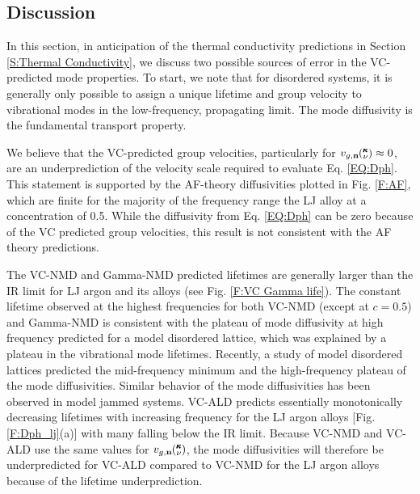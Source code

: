 \documentclass[aps,prb,onecolumn,preprint,footinbib,superscriptaddress,amsmath,amssymb,floatfix]{revtex4}
\newcommand{\kv}{\mspace{-4.0mu}\left(\mspace{-8.0mu}
\begin{smallmatrix}&\pmb{\kappa} \\&\nu\end{smallmatrix}
\mspace{-3.0mu}\right)}
\begin{document}
\clearpage

\subsection{\label{S:Discussion}Discussion}

In this section, in anticipation of the thermal conductivity predictions 
in Section \ref{S:Thermal Conductivity}, we discuss two possible sources 
of error in the VC-predicted mode properties. 
To start, we note that for disordered systems, it is generally only 
possible to assign a 
unique lifetime and group velocity to vibrational modes  
in the low-frequency, propagating limit.
\cite{feldman_numerical_1999,xu_energy_2009} The mode diffusivity 
is the fundamental transport property.
\cite{allen_thermal_1993,feldman_thermal_1993,feldman_numerical_1999} 

We believe that the VC-predicted group velocities, particularly 
for $v_{g,\mathbf{n}}\kv \approx 0$, are an underprediction of the 
velocity scale required to evaluate Eq. \eqref{EQ:Dph}.  
This statement is supported by the 
AF-theory diffusivities plotted in Fig. \ref{F:AF}, 
which are finite for the majority of the frequency range 
the LJ alloy at a concentration 
of 0.5. While the diffusivity from Eq. \eqref{EQ:Dph} can be 
zero because of the VC predicted group velocities, this result is not 
consistent with the AF theory predictions.

The VC-NMD and Gamma-NMD predicted lifetimes are generally larger 
than the IR limit  
for LJ argon and its alloys (see Fig. \ref{F:VC Gamma life}). 
The constant lifetime observed at the highest frequencies  
for both VC-NMD (except at $c=0.5$) and Gamma-NMD is 
consistent with the plateau of mode diffusivity at high 
frequency predicted for a model disordered lattice, 
which was explained by a plateau in the vibrational mode lifetimes.
\cite{sheng_heat_1991} Recently, a study of model disordered lattices 
predicted the mid-frequency minimum and the high-frequency plateau  
of the mode diffusivities.\cite{beltukov_ioffe_2013} Similar 
behavior of the mode diffusivities has been observed in model 
jammed systems.\cite{xu_energy_2009,vitelli_heat_2010} 
VC-ALD predicts essentially monotonically 
decreasing lifetimes with increasing frequency for the LJ argon 
alloys [Fig. \ref{F:Dph_lj}(a)] with many falling below the IR limit. 
Because VC-NMD and VC-ALD use the same values for 
$v_{g,\mathbf{n}}\kv$, the 
mode diffusivities will therefore be underpredicted for 
VC-ALD compared to VC-NMD for the LJ argon alloys because of the 
lifetime underprediction. 
\end{document}
